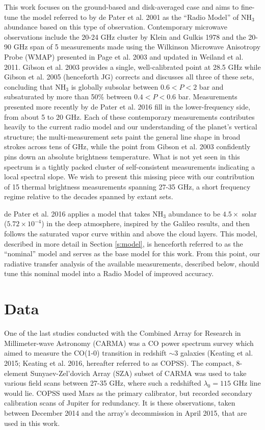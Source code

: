 \documentclass{article}
\newcommand{\e}[1]{\times 10^{#1}}
\begin{document}
	This work focuses on the ground-based and disk-averaged case and aims to fine-tune the model referred to by de Pater et al. 2001 as the ``Radio Model'' of NH$_{3}$ abundance based on this type of observation.
	Contemporary microwave observations include the 20-24 GHz cluster by Klein and Gulkis 1978 and the 20-90 GHz span of 5 measurements made using the Wilkinson Microwave Anisotropy Probe (WMAP) presented in Page et al. 2003 and updated in Weiland et al. 2011.
	Gibson et al. 2003 provides a single, well-calibrated point at 28.5 GHz while Gibson et al. 2005 (henceforth JG) corrects and discusses all three of these sets, concluding that NH$_{3}$ is globally subsolar between $0.6 < P < 2$ bar and subsaturated by more than 50\% between $0.4 < P < 0.6$ bar.
	Measurements presented more recently by de Pater et al. 2016 fill in the lower-frequency side, from about 5 to 20 GHz.
	Each of these contemporary measurements contributes heavily to the current radio model and our understanding of the planet's vertical structure;
	the multi-measurement sets paint the general line shape in broad strokes across tens of GHz, while the point from Gibson et al. 2003 confidently pins down an absolute brightness temperature.
	What is not yet seen in this spectrum is a tightly packed cluster of self-consistent measurements indicating a local spectral slope.
	We wish to present this missing piece with our contribution of 15 thermal brightness measurements spanning 27-35 GHz, a short frequency regime relative to the decades spanned by extant sets.

	de Pater et al. 2016 applies a model that takes NH$_{3}$ abundance to be $4.5 \times$ solar ($5.72 \e{-4}$) in the deep atmosphere, inspired by the Galileo results, and then follows the saturated vapor curve within and above the cloud layers.
	This model, described in more detail in Section \ref{s:model}, is henceforth referred to as the ``nominal'' model and serves as the base model for this work.
	From this point, our radiative transfer analysis of the available measurements, described below, should tune this nominal model into a Radio Model of improved accuracy.


\section{Data} \label{s:data}

	One of the last studies conducted with the Combined Array for Research in Millimeter-wave Astronomy (CARMA) was a CO power spectrum survey which aimed to measure the CO(1-0) transition in redshift $\sim 3$ galaxies (Keating et al. 2015; Keating et al. 2016, hereafter referred to as COPSS).
	The compact, 8-element Sunyaev-Zel'dovich Array (SZA) subset of CARMA was used to take various field scans between 27-35 GHz, where such a redshifted $\lambda_{0} = 115$ GHz line would lie.
	COPSS used Mars as the primary calibrator, but recorded secondary calibration scans of Jupiter for redundancy.
	It is these observations, taken between December 2014 and the array's decommission in April 2015, that are used in this work.
\end{document}
